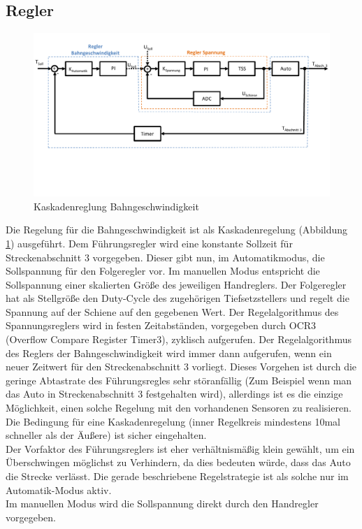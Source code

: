 \documentclass[a4paper, 11pt]{report}
\begin{document}
	\subsection{Regler}
		\begin{figure}[ht]
			\centering
			\includegraphics[width=\textwidth]{rec/Regler.pdf}
			\caption{Kaskadenreglung Bahngeschwindigkeit}
			\label{img:Regelung}
		\end{figure}
		Die Regelung für die Bahngeschwindigkeit ist als Kaskadenregelung (Abbildung \ref{img:Regelung}) ausgeführt.
		Dem Führungsregler wird eine konstante Sollzeit für Streckenabschnitt 3 vorgegeben. Dieser gibt nun, im Automatikmodus, die Sollspannung für den Folgeregler vor.
		Im manuellen Modus entspricht die Sollspannung einer skalierten Größe des jeweiligen Handreglers.
		Der Folgeregler hat als Stellgröße den Duty-Cycle des zugehörigen Tiefsetzstellers und regelt die Spannung auf der Schiene auf den gegebenen Wert.
		Der Regelalgorithmus des Spannungsreglers wird in festen Zeitabständen, vorgegeben durch OCR3 (Overflow Compare Register Timer3), zyklisch aufgerufen.
		Der Regelalgorithmus des Reglers der Bahngeschwindigkeit wird immer dann aufgerufen, wenn ein neuer Zeitwert für den Streckenabschnitt 3 vorliegt.
		Dieses Vorgehen ist durch die geringe Abtastrate des Führungsregles sehr störanfällig (Zum Beispiel wenn man das Auto in Streckenabschnitt 3 festgehalten wird), allerdings ist es die einzige Möglichkeit, einen solche Regelung mit den vorhandenen Sensoren zu realisieren. Die Bedingung für eine Kaskadenregelung (inner Regelkreis mindestens 10mal schneller als der Äußere) ist sicher eingehalten.\\
		Der Vorfaktor des Führungsreglers ist eher verhältnismäßig klein gewählt, um ein Überschwingen möglichst zu Verhindern, da dies bedeuten würde, dass das Auto die Strecke verlässt.
		Die gerade beschriebene Regelstrategie ist als solche nur im Automatik-Modus aktiv.\\
		Im manuellen Modus wird die Sollspannung direkt durch den Handregler vorgegeben.
		\newpage
\end{document}
